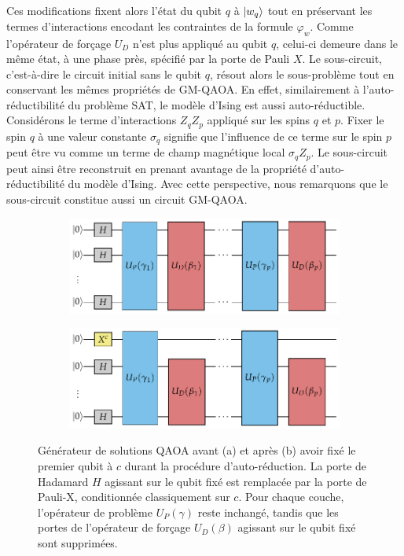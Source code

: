 Ces modifications fixent alors l'état du qubit $q$ à $\ket{w_{q}}$ tout en préservant les termes d'interactions encodant les contraintes de la formule $\varphi_{w}$. Comme l'opérateur de forçage $U_{D}$ n'est plus appliqué au qubit $q$, celui-ci demeure dans le même état, à une phase près, spécifié par la porte de Pauli $X$. Le sous-circuit, c'est-à-dire le circuit initial sans le qubit $q$, résout alors le sous-problème tout en conservant les mêmes propriétés de GM-QAOA. En effet, similairement à l'auto-réductibilité du problème SAT, le modèle d'Ising est aussi auto-réductible. Considérons le terme d'interactions $Z_{q}Z_{p}$ appliqué sur les spins $q$ et $p$. Fixer le spin $q$ à une valeur constante $\sigma_{q}$ signifie que l'influence de ce terme sur le spin $p$ peut être vu comme un terme de champ magnétique local $\sigma_{q} Z_{p}$. Le sous-circuit peut ainsi être reconstruit en prenant avantage de la propriété d'auto-réductibilité du modèle d'Ising. Avec cette perspective, nous remarquons que le sous-circuit constitue aussi un circuit GM-QAOA.     

\begin{figure}[h!]
    \centering
    \begin{subfigure}[h]{0.7\textwidth}
        \centering
        \caption{}
        \includegraphics[width=1\textwidth]{figures/qaoa-self-reducibility-1.pdf}
        \label{fig:vqcount-circuit-a}
    \end{subfigure}
    \begin{subfigure}[h]{0.7\textwidth}
        \centering
        \caption{}
        \includegraphics[width=1\textwidth]{figures/qaoa-self-reducibility-2.pdf}
        \label{fig:vqcount-circuit-b}
    \end{subfigure}
    \caption[Procédure d'auto-réduction de VQCount]{Générateur de solutions QAOA avant (a) et après (b) avoir fixé le premier qubit à $c$ durant la procédure d'auto-réduction. La porte de Hadamard $H$ agissant sur le qubit fixé est remplacée par la porte de Pauli-X, conditionnée classiquement sur $c$. Pour chaque couche, l'opérateur de problème $U_{P}(\gamma)$ reste inchangé, tandis que les portes de l'opérateur de forçage $U_{D}(\beta)$ agissant sur le qubit fixé sont supprimées.}
    \label{fig:vqcount-circuit} 
\end{figure}

